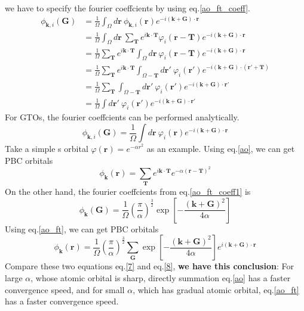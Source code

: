 \documentclass{article}
\begin{document}
    we have to specify the fourier coeffcients by using eq.\eqref{ao_ft_coeff}.
    \begin{align*}
        \phi_{\textbf{k},i}(\textbf{G}) &= \frac{1}{\Omega}\int_\Omega d\textbf{r}\ \phi_{\textbf{k},i}(\textbf{r})e^{-i(\textbf{k}+\textbf{G})\cdot\textbf{r}}\\
        &= \frac{1}{\Omega}\int_\Omega d\textbf{r}\ \sum_{\textbf{T}}e^{i\textbf{k}\cdot\textbf{T}}\varphi_i(\textbf{r}-\textbf{T})e^{-i(\textbf{k}+\textbf{G})\cdot\textbf{r}}\\
        &= \frac{1}{\Omega}\sum_{\textbf{T}}e^{i\textbf{k}\cdot\textbf{T}}\int_\Omega d\textbf{r}\ \varphi_i(\textbf{r}-\textbf{T})e^{-i(\textbf{k}+\textbf{G})\cdot\textbf{r}}\\
        &= \frac{1}{\Omega}\sum_{\textbf{T}}e^{i\textbf{k}\cdot\textbf{T}}\int_{\Omega-\textbf{T}} d\textbf{r}'\ \varphi_i(\textbf{r}')e^{-i(\textbf{k}+\textbf{G})\cdot(\textbf{r}'+\textbf{T})}\\
        &= \frac{1}{\Omega}\sum_{\textbf{T}}\int_{\Omega-\textbf{T}} d\textbf{r}'\ \varphi_i(\textbf{r}')e^{-i(\textbf{k}+\textbf{G})\cdot\textbf{r}'}\\
        &= \frac{1}{\Omega}\int d\textbf{r}'\ \varphi_i(\textbf{r}')e^{-i(\textbf{k}+\textbf{G})\cdot\textbf{r}'}
    \end{align*}
    For GTOs, the fourier coeffcients can be performed analytically.
    \begin{equation}
        \phi_{\textbf{k},i}(\textbf{G}) = \frac{1}{\Omega}\int d\textbf{r}\ \varphi_i(\textbf{r})e^{-i(\textbf{k}+\textbf{G})\cdot\textbf{r}}\label{ao_ft_coeff1}
    \end{equation}
    Take a simple s orbital $\varphi(\textbf{r})=e^{-\alpha r^2}$ as an example.
    Using eq.\eqref{ao}, we can get PBC orbitals
    \begin{equation}
        \phi_{\textbf{k}}(\textbf{r}) = \sum_{\textbf{T}}e^{i\textbf{k}\cdot\textbf{T}}e^{-\alpha (\textbf{r}-\textbf{T})^2}\label{7}
    \end{equation}
    On the other hand, the fourier coeffcients from eq.\eqref{ao_ft_coeff1} is
    \begin{equation*}
        \phi_{\textbf{k}}(\textbf{G}) = \frac{1}{\Omega}\left(\frac{\pi}{\alpha}\right)^{\frac{3}{2}}\exp\left[-\frac{(\textbf{k}+\textbf{G})^2}{4\alpha}\right]
    \end{equation*}
    Using eq.\eqref{ao_ft}, we can get PBC orbitals
    \begin{equation}
        \phi_{\textbf{k}}(\textbf{r}) = \frac{1}{\Omega}\left(\frac{\pi}{\alpha}\right)^{\frac{3}{2}}\sum_{\textbf{G}}\exp\left[-\frac{(\textbf{k}+\textbf{G})^2}{4\alpha}\right]e^{i(\textbf{k}+\textbf{G})\cdot\textbf{r}}\label{8}
    \end{equation}
    Compare these two equations eq.\eqref{7} and eq.\eqref{8}, \textbf{we have this conclusion}:
    For large $\alpha$, whose atomic orbital is sharp, directly summation eq.\eqref{ao} has a faster convergence speed,
    and for small $\alpha$, which has gradual atomic orbital, eq.\eqref{ao_ft} has a faster convergence speed.
    
\end{document}
